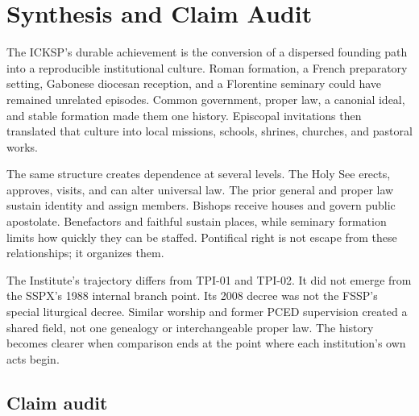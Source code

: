 \section{Synthesis and Claim Audit}

The ICKSP's durable achievement is the conversion of a dispersed founding path into a reproducible institutional culture. Roman formation, a French preparatory setting, Gabonese diocesan reception, and a Florentine seminary could have remained unrelated episodes. Common government, proper law, a canonial ideal, and stable formation made them one history. Episcopal invitations then translated that culture into local missions, schools, shrines, churches, and pastoral works.

The same structure creates dependence at several levels. The Holy See erects, approves, visits, and can alter universal law. The prior general and proper law sustain identity and assign members. Bishops receive houses and govern public apostolate. Benefactors and faithful sustain places, while seminary formation limits how quickly they can be staffed. Pontifical right is not escape from these relationships; it organizes them.

The Institute's trajectory differs from TPI-01 and TPI-02. It did not emerge from the SSPX's 1988 internal branch point. Its 2008 decree was not the FSSP's special liturgical decree. Similar worship and former PCED supervision created a shared field, not one genealogy or interchangeable proper law. The history becomes clearer when comparison ends at the point where each institution's own acts begin.

\subsection{Claim audit}




